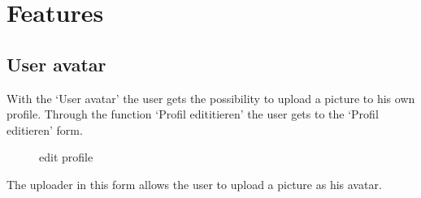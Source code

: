 \chapter{Features}\label{chap:features}





\section{User avatar}
With the `User avatar' the user gets the possibility to upload a picture to his own profile. Through the function `Profil edititieren'  the user gets to the `Profil editieren' form. 
\pagebreak

\begin{figure}[!h]
  \centering
  \caption{edit profile}
  \label{fig:profil_editieren}
\end{figure}

The uploader in this form allows the user to upload a picture as his avatar.

\pagebreak

